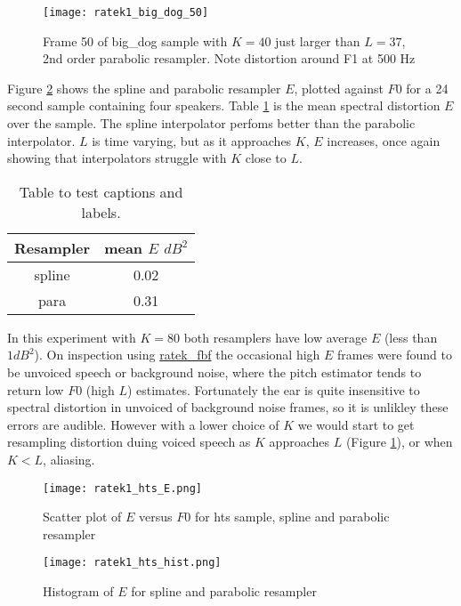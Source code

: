 \documentclass{article}
\begin{document}
\begin{figure}[h]
\caption{Frame 50 of big\_dog sample with $K=40$ just larger than $L=37$, 2nd order parabolic resampler.  Note distortion around F1 at 500 Hz }
\label{fig:ratek1_big_dog_50}
\texttt{[image: ratek1\_big\_dog\_50]}
\end{figure}

Figure \ref{fig:ratek1_hts_E} shows the spline and parabolic resampler $E$, plotted against $F0$ for a 24 second sample containing four speakers.  Table \ref{table:ratek1_mean_E} is the mean spectral distortion $E$ over the sample.  The spline interpolator perfoms better than the parabolic interpolator.  $L$ is time varying, but as it approaches $K$, $E$ increases, once again showing that interpolators struggle with $K$ close to $L$.

\begin{table}[h]
\centering
\begin{tabular}{c c }
 \hline
 Resampler & mean $E$ $dB^2$ \\
 \hline
 spline & 0.02 \\ 
 para  & 0.31 \\
 \hline
\end{tabular}
\caption{Table to test captions and labels.}
\label{table:ratek1_mean_E}
\end{table}

In this experiment with $K=80$ both resamplers have low average $E$ (less than $1 dB^2$). On inspection using \url{ratek_fbf} the occasional high $E$ frames were found to be unvoiced speech or background noise, where the pitch estimator tends to return low $F0$ (high $L$) estimates.  Fortunately the ear is quite insensitive to spectral distortion in unvoiced of background noise frames, so it is unlikley these errors are audible.  However with a lower choice of $K$ we would start to get resampling distortion duing voiced speech as $K$ approaches $L$ (Figure \ref{fig:ratek1_big_dog_50}), or when $K<L$, aliasing.

\begin{figure}[h]
\caption{Scatter plot of $E$ versus $F0$ for hts sample, spline and parabolic resampler}
\label{fig:ratek1_hts_E}
\texttt{[image: ratek1\_hts\_E.png]}
\end{figure}

\begin{figure}[h]
\caption{Histogram of $E$ for spline and parabolic resampler}
\label{fig:ratek1_hts_hist}
\texttt{[image: ratek1\_hts\_hist.png]}
\end{figure}
\end{document}
